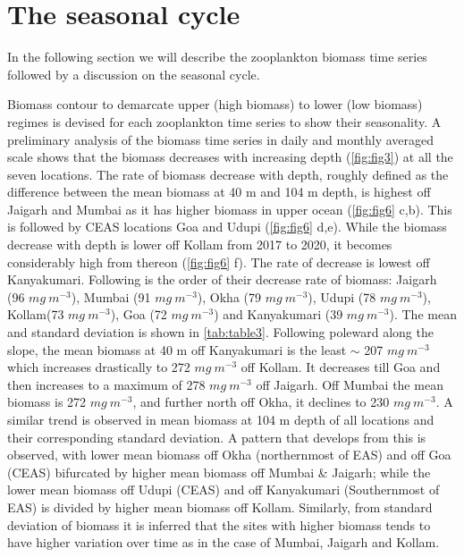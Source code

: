 \documentclass{article}
\begin{document}
	 
	 
	 
	\section{The seasonal cycle}
	In the following section we will describe the zooplankton biomass time series followed by a discussion on the seasonal cycle.

	Biomass contour to demarcate upper (high biomass) to lower (low biomass) regimes is devised for each zooplankton time series to show their seasonality. A preliminary analysis of the biomass time series in daily and monthly averaged scale shows that the biomass decreases with increasing depth (\cref{fig:fig3}) at all the seven locations. The rate of biomass decrease with depth, roughly defined as the difference between the mean biomass at 40 m  and 104 m depth, is highest off Jaigarh and Mumbai as it has higher biomass in upper ocean (\cref{fig:fig6} c,b). This is followed by CEAS locations Goa and Udupi (\cref{fig:fig6} d,e). While the biomass decrease with depth is lower off Kollam from 2017 to 2020, it becomes considerably high from thereon (\cref{fig:fig6} f). The rate of decrease is lowest off Kanyakumari. Following is the order of their decrease rate of biomass: Jaigarh (96 $mg\ m^{-3}$), Mumbai (91 $mg\ m^{-3}$), Okha (79 $mg\ m^{-3}$), Udupi (78 $mg\ m^{-3}$), Kollam(73 $mg\ m^{-3}$), Goa (72 $mg\ m^{-3}$) and Kanyakumari (39 $mg\ m^{-3}$).  The mean and standard deviation is shown in \autoref{tab:table3}. Following poleward along the slope, the mean biomass at 40 m off Kanyakumari is the least $\sim$ 207 $mg\ m^{-3}$ which increases drastically to 272 $mg\ m^{-3}$ off Kollam. It decreases till Goa and then increases to a maximum of 278 $mg\ m^{-3}$ off Jaigarh. Off Mumbai the mean biomass is 272 $mg\ m^{-3}$, and further north off Okha, it declines to 230 $mg\ m^{-3}$. A similar trend is observed in mean biomass at 104 m depth of all locations and their corresponding standard deviation. A pattern that develops from this is observed, with lower mean biomass off Okha (northernmost of EAS) and off Goa (CEAS) bifurcated by higher mean biomass off Mumbai \& Jaigarh; while the lower mean biomass off Udupi (CEAS) and off Kanyakumari (Southernmost of EAS) is divided by higher mean biomass off Kollam. Similarly, from standard deviation of biomass it is inferred that the sites with higher biomass tends to have higher variation over time as in the case of Mumbai, Jaigarh and Kollam. 
	
\end{document}
